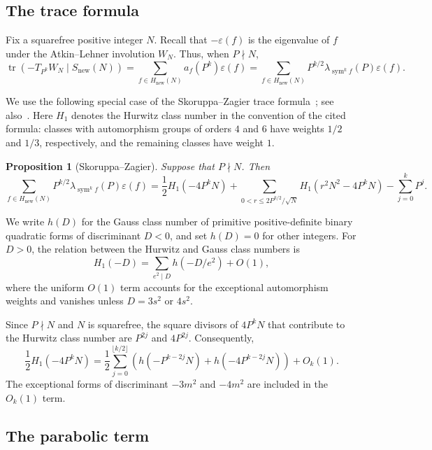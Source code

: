\documentclass[12pt,reqno]{amsart}
\numberwithin{equation}{section}
\theoremstyle{plain}
\newtheorem{proposition}[theorem]{Proposition}
\theoremstyle{definition}
\theoremstyle{remark}
\newcommand{\sym}{\operatorname{sym}}
\begin{document}
\subsection{The trace formula}

Fix a squarefree positive integer $N$.
Recall that $-\varepsilon(f)$ is the eigenvalue of  $f$ under the Atkin--Lehner involution $W_N$.
Thus, when $P\nmid N$,
\[
\operatorname{tr}\left(-T_{P^k}W_N\mid S_{\mathrm{new}}(N)\right)
=
\sum_{f\in H_{\mathrm{new}}(N)}
a_f(P^k)\varepsilon(f)
=
\sum_{f\in H_{\mathrm{new}}(N)}
P^{k/2}\lambda_{\sym^k f}(P)\varepsilon(f).
\]

We use the following special case of the Skoruppa--Zagier trace formula~\cite[\S2, formulas~(5) and~(7)]{SkoruppaZagier1988}; see also~\cite[Theorem~2.1]{KunduMuller2026}.
Here $H_1$ denotes the Hurwitz class number in the convention of the cited formula: classes with automorphism groups of orders $4$ and $6$ have weights $1/2$ and $1/3$, respectively, and the remaining classes have weight $1$.

\begin{proposition}[Skoruppa--Zagier]\label{prop:trace-formula}
Suppose that $P\nmid N$.  Then
\begin{equation*}
\sum_{f\in H_{\mathrm{new}}(N)}
P^{k/2}\lambda_{\sym^k f}(P)\varepsilon(f)
=
\frac12H_1(-4P^kN)
+
\sum_{0<r\leq 2P^{k/2}/\sqrt N}
H_1(r^2N^2-4P^kN)
-
\sum_{j=0}^kP^j.
\end{equation*}
\end{proposition}

We write $h(D)$ for the Gauss class number of primitive positive-definite binary quadratic forms of discriminant $D<0$, and set $h(D)=0$ for other integers.
For $D>0$, the relation between the Hurwitz and Gauss class numbers is
\[
H_1(-D)
=
\sum_{e^2\mid D}h(-D/e^2)+O(1),
\]
where the uniform $O(1)$ term accounts for the exceptional automorphism weights and vanishes unless $D=3s^2$ or $4s^2$.

Since $P\nmid N$ and $N$ is squarefree, the square divisors of $4P^kN$ that contribute to the Hurwitz class number are $P^{2j}$ and $4P^{2j}$.  Consequently,
\begin{equation}\label{eq:parabolic-decomposition}
\frac12H_1(-4P^kN)
=
\frac12
\sum_{j=0}^{\lfloor k/2\rfloor}
\left(
h(-P^{k-2j}N)+h(-4P^{k-2j}N)
\right)
+O_k(1).
\end{equation}
The exceptional forms of discriminant $-3m^2$ and $-4m^2$ are included in the $O_k(1)$ term.

\subsection{The parabolic term}
\end{document}
